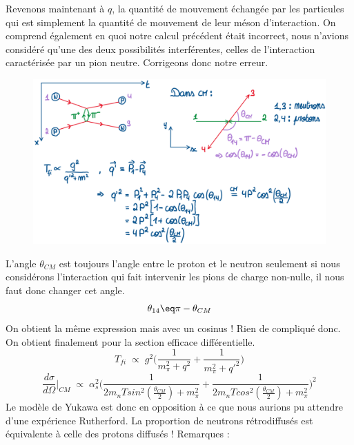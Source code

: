 Revenons maintenant à $q$, la quantité de mouvement échangée par les particules qui est simplement la quantité de mouvement de leur méson d'interaction. On comprend également en quoi notre calcul précédent était incorrect, nous n'avions considéré qu'une des deux possibilités interférentes, celles de l'interaction caractérisée par un pion neutre. Corrigeons donc notre erreur.\\
\begin{figure}[H]
    \centering
    \includegraphics[scale = 0.4]{Images4/Feynmann_pi2.png}
\end{figure}
L'angle $\theta_{CM}$ est toujours l'angle entre le proton et le neutron seulement si nous considérons l'interaction qui fait intervenir les pions de charge non-nulle, il nous faut donc changer cet angle.
\begin{equation*}
    \theta_{14} \eq \pi - \theta_{CM}
\end{equation*}
On obtient la même expression mais avec un cosinus ! Rien de compliqué donc. On obtient finalement pour la section efficace différentielle.
\begin{equation*}
    \boxed{
        T_{fi} \; \propto\; g^2 \Big(\frac{1}{m_\pi^2 + q^2} + \frac{1}{m_\pi^2 + q'^2}\Big)
    }
\end{equation*}
\begin{equation*}
    \boxed{
        \dfrac{d\sigma}{d\Omega}\Big|_{CM} \;\propto\;\alpha_s^2 \Big(\frac{1}{2m_n T sin^2(\frac{\theta_{CM}}{2})+m^2_\pi} + \frac{1}{2m_n T cos^2(\frac{\theta_{CM}}{2})+m^2_\pi}\Big)^2
    }
\end{equation*}
Le modèle de Yukawa est donc en opposition à ce que nous aurions pu attendre d'une expérience Rutherford. La proportion de neutrons rétrodiffusés est équivalente à celle des protons diffusés !
Remarques :
